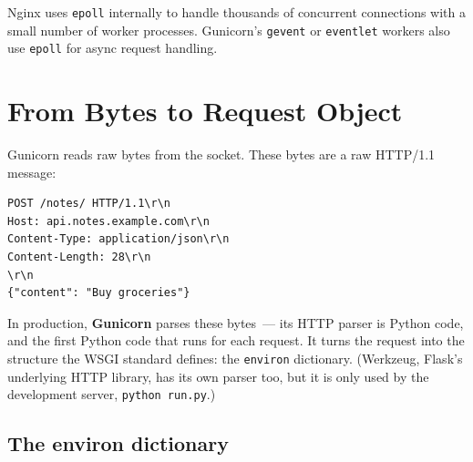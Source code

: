 \noindent{}Nginx uses \texttt{epoll} internally to handle thousands of concurrent connections with a small number of worker processes. Gunicorn's \texttt{gevent} or \texttt{eventlet} workers also use \texttt{epoll} for async request handling.

\setcounter{section}{3}
\section{From Bytes to Request Object}\label{30-kernel-application-handoff:304-from-bytes-to-request-object}

Gunicorn reads raw bytes from the socket. These bytes are a raw HTTP/1.1 message:

\begin{outputbox}[short]
\begin{Verbatim}[fontsize=\codesize, breaklines, breakanywhere, breaksymbolleft={\tiny\textcolor{muted}{$\hookrightarrow$}}]
POST /notes/ HTTP/1.1\r\n
Host: api.notes.example.com\r\n
Content-Type: application/json\r\n
Content-Length: 28\r\n
\r\n
{"content": "Buy groceries"}
\end{Verbatim}
\end{outputbox}

\noindent{}In production, \textbf{Gunicorn} parses these bytes~--- its HTTP parser is Python code, and the first Python code that runs for each request. It turns the request into the structure the WSGI standard defines: the \texttt{environ} dictionary. (Werkzeug, Flask's underlying HTTP library, has its own parser too, but it is only used by the development server, \texttt{python\ run.py}.)

\subsection*{The environ dictionary}\label{30-kernel-application-handoff:the-environ-dictionary}

